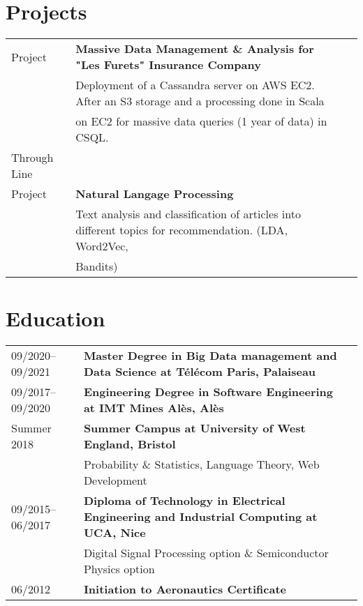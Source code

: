 \documentclass[9pt]{article}
\begin{document}
    \section*{Projects}
    \begin{tabular}{lll}
        Project&{\bf Massive Data Management \& Analysis for "Les Furets" Insurance Company}\\
        &Deployment of a Cassandra server on AWS EC2. After an S3 storage and a processing done in Scala\\
        &on EC2 for massive data queries (1 year of data) in CSQL.\\
        Through Line \\ Project&{\bf Natural Langage Processing}\\
        &Text analysis and classification of articles into different topics for recommendation. (LDA, Word2Vec,\\
        &Bandits)\\
    \end{tabular}

    \section*{Education}
    \begin{tabular}{lll}
        09/2020--09/2021&{\bf Master Degree in Big Data management and Data Science at Télécom Paris, Palaiseau}\\
        09/2017--09/2020&{\bf Engineering Degree in Software Engineering at IMT Mines Alès, Alès}\\
        Summer 2018&{\bf Summer Campus at University of West England, Bristol}\\
        & Probability \& Statistics, Language Theory, Web Development\\
        09/2015--06/2017&{\bf Diploma of Technology in Electrical Engineering and Industrial Computing at UCA, Nice}\\
        &Digital Signal Processing option \& Semiconductor Physics option\\
        06/2012&{\bf Initiation to Aeronautics Certificate}
    \end{tabular}
\end{document}
